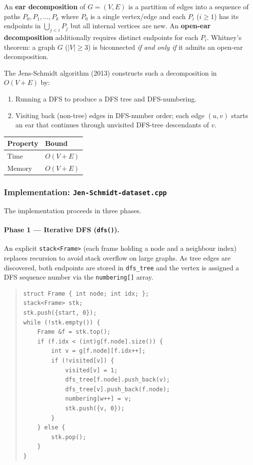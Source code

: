 \documentclass[12pt,a4paper]{article}
\newcommand{\code}[1]{\texttt{#1}}
\begin{document}
An \textbf{ear decomposition} of $G=(V,E)$ is a partition of edges into a
sequence of paths $P_0, P_1, \ldots, P_k$ where $P_0$ is a single
vertex/edge and each $P_i$ ($i \geq 1$) has its endpoints in
$\bigcup_{j<i} P_j$ but all internal vertices are new.  An
\textbf{open-ear decomposition} additionally requires distinct endpoints
for each $P_i$.  Whitney's theorem: a graph $G$ ($|V| \geq 3$) is
biconnected \emph{if and only if} it admits an open-ear decomposition.

The Jens-Schmidt algorithm (2013) constructs such a decomposition in
$O(V+E)$ by:
\begin{enumerate}
    \item Running a DFS to produce a DFS tree and DFS-numbering.
    \item Visiting back (non-tree) edges in DFS-number order; each edge
          $(u,v)$ starts an ear that continues through unvisited
          DFS-tree descendants of $v$.
\end{enumerate}

\begin{center}
\begin{tabular}{|l|l|}
\hline
\textbf{Property} & \textbf{Bound} \\ \hline
Time   & $O(V + E)$ \\ \hline
Memory & $O(V + E)$ \\ \hline
\end{tabular}
\end{center}

\subsubsection{Implementation: \texttt{Jen-Schmidt-dataset.cpp}}

The implementation proceeds in three phases.

\paragraph{Phase 1 --- Iterative DFS (\code{dfs()}).}
An explicit \code{stack<Frame>} (each frame holding a node and a neighbour
index) replaces recursion to avoid stack overflow on large graphs.  As
tree edges are discovered, both endpoints are stored in \code{dfs\_tree}
and the vertex is assigned a DFS sequence number via the
\code{numbering[]} array.

\begin{quote}
\begin{verbatim}
struct Frame { int node; int idx; };
stack<Frame> stk;
stk.push({start, 0});
while (!stk.empty()) {
    Frame &f = stk.top();
    if (f.idx < (int)g[f.node].size()) {
        int v = g[f.node][f.idx++];
        if (!visited[v]) {
            visited[v] = 1;
            dfs_tree[f.node].push_back(v);
            dfs_tree[v].push_back(f.node);
            numbering[w++] = v;
            stk.push({v, 0});
        }
    } else {
        stk.pop();
    }
}
\end{verbatim}
\end{quote}
\end{document}
